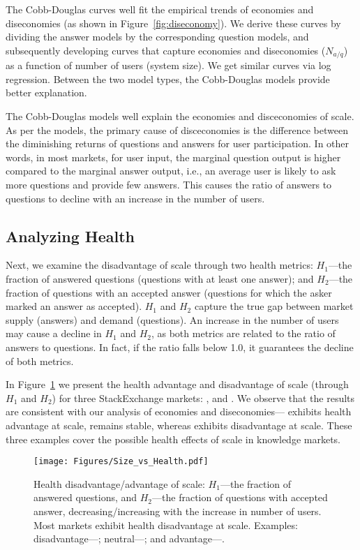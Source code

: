 The Cobb-Douglas curves well fit the empirical trends of economies and diseconomies (as shown in Figure~\ref{fig:diseconomy}). We derive these curves by dividing the answer models by the corresponding question models, and subsequently developing curves that capture economies and diseconomies ($N_{a/q}$) as a function of number of users (system size). We get similar curves via log regression. Between the two model types, the Cobb-Douglas models provide better explanation.

The Cobb-Douglas models well explain the economies and disceconomies of scale. As per the models, the primary cause of disceconomies is the difference between the diminishing returns of questions and answers for user participation. In other words, in most markets, for user input, the marginal question output is higher compared to the marginal answer output, i.e., an average user is likely to ask more questions and provide few answers. This causes the ratio of answers to questions to decline with an increase in the number of users. 

\subsection{Analyzing Health}
Next, we examine the disadvantage of scale through two health metrics: $H_1$---the fraction of answered questions (questions with at least one answer); and $H_2$---the fraction of questions with an accepted answer (questions for which the asker marked an answer as accepted). $H_1$ and $H_2$ capture the true gap between market supply (answers) and demand (questions). An increase in the number of users may cause a decline in $H_1$ and $H_2$, as both metrics are related to the ratio of answers to questions. In fact, if the ratio falls below 1.0, it guarantees the decline of both metrics. 

In Figure~\ref{fig:health} we present the health advantage and disadvantage of scale (through $H_1$ and $H_2$) for three StackExchange markets: ,  and . We observe that the results are consistent with our analysis of economies and diseconomies--- exhibits health advantage at scale,  remains stable, whereas  exhibits disadvantage at scale. These three examples cover the possible health effects of scale in knowledge markets. 

\begin{figure}[t]
\centering
\texttt{[image: Figures/Size\_vs\_Health.pdf]}
\caption{Health disadvantage/advantage of scale: $H_1$---the fraction of answered questions, and $H_2$---the fraction of questions with accepted answer, decreasing/increasing with the increase in number of users. Most  markets exhibit health disadvantage at scale. Examples: disadvantage---; neutral---; and advantage---.}
\label{fig:health}
\end{figure}

